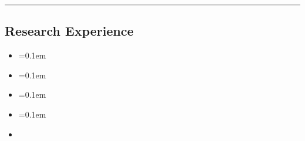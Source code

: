\hrule
\vspace{-1em}
\subsection*{Research Experience}

\begin{itemize}[label={},leftmargin=1em]
\parskip=0.1em

	\item 

    \parskip=0.1em
    
    \item 

    \parskip=0.1em

    \item 

    \parskip=0.1em
    
    \item 

    \parskip=0.1em

    \item 
	
\end{itemize}